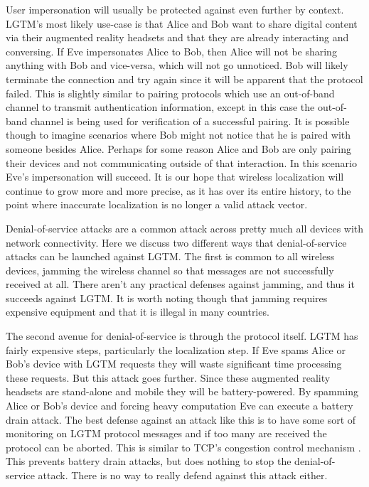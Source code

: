 \documentclass[12pt]{report}
\begin{document}
User impersonation will usually be protected against even further by context. LGTM's most likely use-case is that Alice and Bob want to share digital content via their augmented reality headsets and that they are already interacting and conversing. If Eve impersonates Alice to Bob, then Alice will not be sharing anything with Bob and vice-versa, which will not go unnoticed. Bob will likely terminate the connection and try again since it will be apparent that the protocol failed. This is slightly similar to pairing protocols which use an out-of-band channel to transmit authentication information, except in this case the out-of-band channel is being used for verification of a successful pairing. It is possible though to imagine scenarios where Bob might not notice that he is paired with someone besides Alice. Perhaps for some reason Alice and Bob are only pairing their devices and not communicating outside of that interaction. In this scenario Eve's impersonation will succeed. It is our hope that wireless localization will continue to grow more and more precise, as it has over its entire history, to the point where inaccurate localization is no longer a valid attack vector. \par

Denial-of-service attacks are a common attack across pretty much all devices with network connectivity. Here we discuss two different ways that denial-of-service attacks can be launched against LGTM. The first is common to all wireless devices, jamming the wireless channel so that messages are not successfully received at all. There aren't any practical defenses against jamming, and thus it succeeds against LGTM. It is worth noting though that jamming requires expensive equipment and that it is illegal in many countries. \par

The second avenue for denial-of-service is through the protocol itself. LGTM has fairly expensive steps, particularly the localization step. If Eve spams Alice or Bob's device with LGTM requests they will waste significant time processing these requests. But this attack goes further. Since these augmented reality headsets are stand-alone and mobile they will be battery-powered. By spamming Alice or Bob's device and forcing heavy computation Eve can execute a battery drain attack. The best defense against an attack like this is to have some sort of monitoring on LGTM protocol messages and if too many are received the protocol can be aborted. This is similar to TCP's congestion control mechanism \cite{TcpCongestionControl2009}. This prevents battery drain attacks, but does nothing to stop the denial-of-service attack. There is no way to really defend against this attack either. \par
\end{document}
